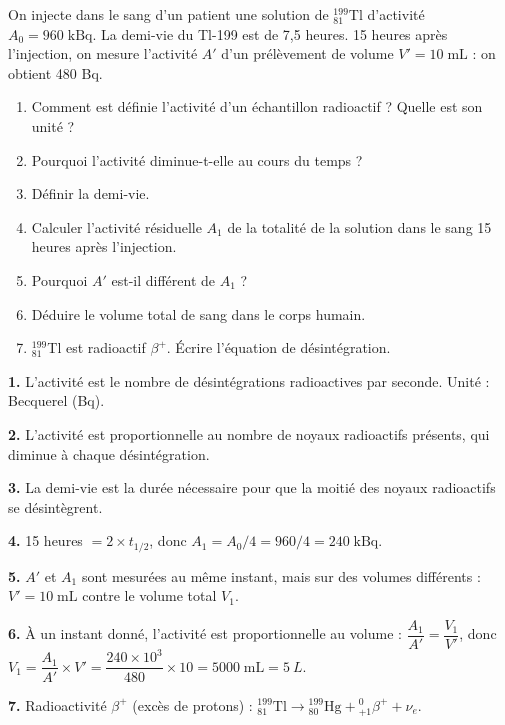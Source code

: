 \documentclass[12pt,a4paper]{article}
\begin{document}
\begin{boiteexercice}
On injecte dans le sang d'un patient une solution de ${}_{81}^{199}$Tl d'activité $A_0 = 960\;\text{kBq}$. La demi-vie du Tl-199 est de 7,5 heures. 15 heures après l'injection, on mesure l'activité $A'$ d'un prélèvement de volume $V' = 10\;\text{mL}$ : on obtient 480 Bq.
\begin{enumerate}
  \item Comment est définie l'activité d'un échantillon radioactif ? Quelle est son unité ?
  \item Pourquoi l'activité diminue-t-elle au cours du temps ?
  \item Définir la demi-vie.
  \item Calculer l'activité résiduelle $A_1$ de la totalité de la solution dans le sang 15 heures après l'injection.
  \item Pourquoi $A'$ est-il différent de $A_1$ ?
  \item Déduire le volume total de sang dans le corps humain.
  \item ${}_{81}^{199}$Tl est radioactif $\beta^+$. Écrire l'équation de désintégration.
\end{enumerate}
\end{boiteexercice}

\begin{boitecorrige}
\textbf{1.} L'activité est le nombre de désintégrations radioactives par seconde. Unité : Becquerel (Bq).

\textbf{2.} L'activité est proportionnelle au nombre de noyaux radioactifs présents, qui diminue à chaque désintégration.

\textbf{3.} La demi-vie est la durée nécessaire pour que la moitié des noyaux radioactifs se désintègrent.

\textbf{4.} 15 heures $= 2 \times t_{1/2}$, donc $A_1 = A_0/4 = 960/4 = 240\;\text{kBq}$.

\textbf{5.} $A'$ et $A_1$ sont mesurées au même instant, mais sur des volumes différents : $V' = 10\;\text{mL}$ contre le volume total $V_1$.

\textbf{6.} À un instant donné, l'activité est proportionnelle au volume : $\dfrac{A_1}{A'} = \dfrac{V_1}{V'}$, donc $V_1 = \dfrac{A_1}{A'}\times V' = \dfrac{240\times10^3}{480}\times10 = 5000\;\text{mL} = \qty{5}{L}$.

\textbf{7.} Radioactivité $\beta^+$ (excès de protons) : ${}_{81}^{199}\text{Tl} \rightarrow {}_{80}^{199}\text{Hg} + {}_{+1}^{0}\beta^+ + \nu_e$.
\end{boitecorrige}
\end{document}
